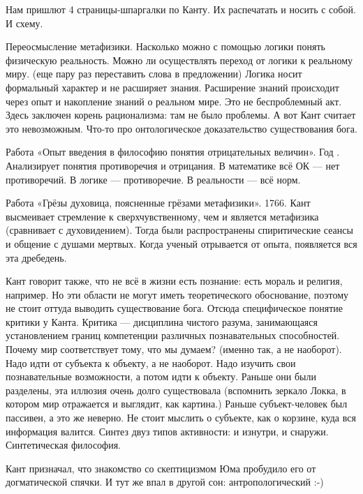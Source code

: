 Нам пришлют 4 страницы-шпаргалки по Канту. Их распечатать и носить с собой. И схему.

Переосмысление метафизики. 
Насколько можно с помощью логики понять физическую реальность. Можно ли осуществлять переход от логики к реальному миру. (еще пару раз переставить слова в предложении) 
Логика носит формальный характер и не расширяет знания. Расширение знаний происходит через опыт и накопление знаний о реальном мире.
Это не беспроблемный акт. Здесь заключен корень рационализма: там не было проблемы. А вот Кант считает это невозможным. 
Что-то про онтологическое доказательство существования бога.

Работа «Опыт введения в философию понятия отрицательных величин». Год \na. Анализирует понятия противоречия и отрицания. В математике всё ОК --- нет противоречий. В логике --- противоречие. В реальности --- всё норм.

Работа «Грёзы духовица, поясненные грёзами метафизики». 1766. Кант высмеивает стремление к сверхчувственному, чем и является метафизика (сравнивает с духовидением). 
Тогда были распространены спиритические сеансы и общение с душами мертвых. Когда ученый отрывается от опыта, появляется вся эта дребедень.

Кант говорит также, что не всё в жизни есть познание: есть мораль и религия, например. Но эти области не могут иметь теоретического обоснование, поэтому не стоит оттуда выводить существование бога. 
Отсюда специфическое понятие критики у Канта. Критика --- дисциплина чистого разума, занимающаяся установлением границ компетенции различных познавательных способностей.
Почему мир соответствует тому, что мы думаем? (именно так, а не наоборот). Надо идти от субъекта к объекту, а не наоборот. Надо изучить свои познавательные возможности, а потом идти к объекту. 
Раньше они были разделены, эта иллюзия очень долго существовала (вспомнить зеркало Локка, в котором мир отражается и выглядит, как картина.) 
Раньше субъект-человек был пассивен, а это же неверно. Не стоит мыслить о субъекте, как о корзине, куда вся информация валится. Синтез двуз типов активности: и изнутри, и снаружи. Синтетическая философия.

Кант призначал, что знакомство со скептицизмом Юма пробудило его от догматической спячки. И тут же впал в другой сон: антропологический :-)
